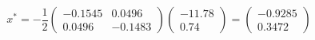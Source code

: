 

\[
x^{*} = -\frac{1}{2} \left( \begin{array}{ll} -0.1545 &  0.0496 \\ 0.0496 &  -0.1483 \end{array} \right) \left( \begin{array}{c} -11.78 \\ 0.74 \end{array} \right) = \left( \begin{array}{c} -0.9285 \\ 0.3472 \end{array} \right)
\]


